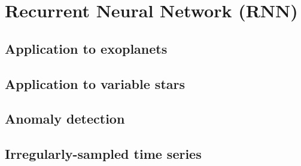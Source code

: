 
\section{Recurrent Neural Network (RNN)}
\red{[TODO]}

\subsection{Application to exoplanets}
\red{[TODO]}
\subsection{Application to variable stars}
\red{[TODO]}
\subsection{Anomaly detection}
\red{[TODO]}
\subsection{Irregularly-sampled time series}
\red{[TODO]}